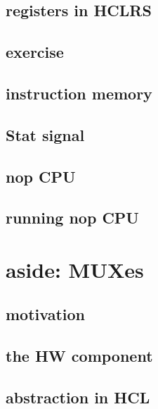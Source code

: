 

\subsection{registers in HCLRS}



\subsection{exercise}



\subsection{instruction memory}



\subsection{Stat signal}



\subsection{nop CPU}


\subsection{running nop CPU}





\section{aside: MUXes}
\subsection{motivation}
\subsection{the HW component}


\subsection{abstraction in HCL}



